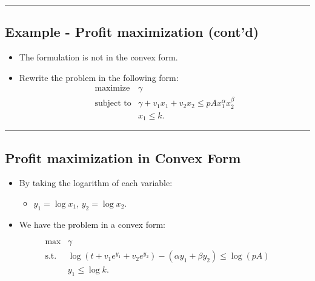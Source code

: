 \documentclass[
]{article}
\providecommand{\tightlist}{%
  \setlength{\itemsep}{0pt}\setlength{\parskip}{0pt}}
\begin{document}
\begin{center}\rule{0.5\linewidth}{0.5pt}\end{center}

\subsection{Example - Profit maximization
(cont'd)}\label{example---profit-maximization-contd}

\begin{itemize}
\tightlist
\item
  The formulation is not in the convex form.
\item
  Rewrite the problem in the following form: \[\begin{array}{ll}
    \text{maximize} & \gamma \\
    \text{subject to} & \gamma  + v_1 x_1  + v_2 x_2 \le p A x_1^{\alpha} x_2^{\beta}\\
                  & x_1 \le k.
    \end{array}\]
\end{itemize}

\begin{center}\rule{0.5\linewidth}{0.5pt}\end{center}

\subsection{Profit maximization in Convex
Form}\label{profit-maximization-in-convex-form}

\begin{itemize}
\item
  By taking the logarithm of each variable:

  \begin{itemize}
  \tightlist
  \item
    \(y_1 = \log x_1\), \(y_2 = \log x_2\).
  \end{itemize}
\item
  We have the problem in a convex form:
\end{itemize}

\[\begin{array}{ll}
    \text{max}  & \gamma \\
    \text{s.t.} & \log(t + v_1 e^{y_1} + v_2 e^{y_2}) - (\alpha y_1 + \beta y_2) \le \log(pA) \\
                & y_1 \le \log k.
\end{array}\]
\end{document}
